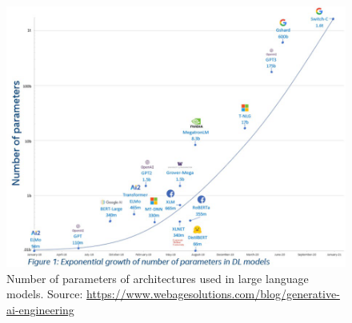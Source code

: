 \begin{figure}[t]
    \centering
    \includegraphics[width=\textwidth]{gfx/expo_parameters.png}
    \caption{Number of parameters of architectures used in large language models. Source: \url{https://www.webagesolutions.com/blog/generative-ai-engineering}}
    \label{fig:expo_parameters}
\end{figure}
\\

